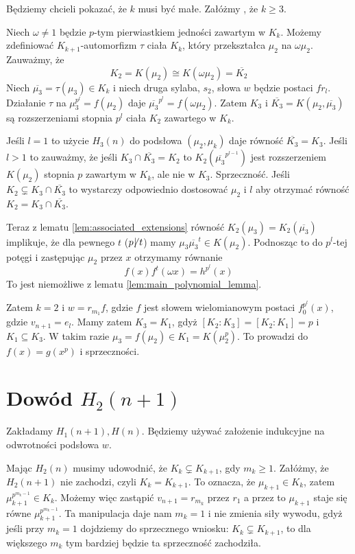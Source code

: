 Będziemy chcieli pokazać, że $k$ musi być małe. Załóżmy , że $k \geq 3$.

Niech $\omega \neq 1$ będzie $p$-tym pierwiastkiem jedności zawartym w $K_k$.
Możemy zdefiniować $K_{k+1}$-automorfizm $\tau$ ciała $K_k$, który przekształca
$\mu_2$ na $\omega \mu_2$.
Zauważmy, że 
\[K_2 = K\left(\mu_2\right) \cong K\left(\omega \mu_2\right) =
\overline{K_2}\]
Niech $\overline{\mu_3} = \tau(\mu_3) \in K_k$ i niech druga sylaba, $s_2$,
słowa $w$ będzie postaci $fr_l$.
Działanie $\tau$ na $\mu_3^{p^l} = f\left(\mu_2\right)$ daje
$\overline{\mu_3}^{p^l} = f\left(\omega\mu_2\right)$. Zatem $K_3$ i
$\overline{K_3} = K\left(\mu_2, \overline{\mu_3}\right)$ są rozszerzeniami
stopnia $p^l$ ciała $K_2$ zawartego w $K_k$.

Jeśli $l = 1$ to użycie $H_3(n)$ do podsłowa $\left(\mu_2, \mu_k\right)$ daje
równość $\overline{K_3} = K_3$. Jeśli $l > 1$ to zauważmy, że jeśli $K_3 \cap
\overline{K_3} = K_2$ to $K_2\left(\overline{\mu_3}^{p^{l-1}}\right)$ jest
rozszerzeniem $K\left(\mu_2\right)$ stopnia $p$ zawartym w $K_k$, ale
nie w $K_3$. Sprzeczność. Jeśli $K_2 \subsetneq K_3 \cap \overline{K_3}$ to
wystarczy odpowiednio dostosować $\mu_2$ i $l$ aby otrzymać równość
$K_2 = K_3 \cap \overline{K_3}$.

Teraz z lematu \ref{lem:associated_extensions} równość $K_2\left(\mu_3\right) =
K_2\left(\overline{\mu_3}\right)$ implikuje, że dla pewnego $t$ 
($p \!\! \not \! | \; t$)
mamy $\mu_3\overline{\mu_3}^t \in K\left(\mu_2\right)$. Podnosząc to do
$p^l$-tej potęgi i zastępując $\mu_2$ przez $x$ otrzymamy równanie
\[ f(x)f^t(\omega x) = h^{p^l}(x)\]
To jest niemożliwe z lematu \ref{lem:main_polynomial_lemma}. 

Zatem $k = 2$ i $w = r_{m_1}f$, gdzie $f$ jest słowem wielomianowym postaci
$f_0^{p^l}(x)$, gdzie $v_{n+1} = e_l$. Mamy zatem $K_3 = K_1$, gdyż 
$\left[K_2 : K_3\right] = \left[K_2 : K_1\right] = p$ i $K_1 \subseteq K_3$.
W takim razie $\mu_3 = f\left(\mu_2\right) \in K_1 = K\left(\mu_2^p\right)$. To
prowadzi do $f(x) = g\left(x^p\right)$ i sprzeczności.

\section{Dowód $H_2(n+1)$}
Zakładamy $H_1(n+1), H(n)$. Będziemy używać założenie indukcyjne na odwrotności
podsłowa $w$.

Mając $H_2(n)$ musimy udowodnić, że $K_k \subsetneq K_{k+1}$, gdy $m_k \geq 1$.
Załóżmy, że $H_2(n+1)$ nie zachodzi, czyli $K_k = K_{k+1}$. To oznacza, że
$\mu_{k+1} \in K_k$, zatem $\mu_{k+1}^{p^{m_k -1}} \in K_k$.
Możemy więc zastąpić $v_{n + 1} = r_{m_k}$ przez $r_1$ a przez to 
$\mu_{k+1}$ staje się równe $\mu_{k+1}^{p^{m_k - 1}}$. Ta manipulacja daje nam
$m_k = 1$ i nie zmienia siły wywodu, gdyż jeśli przy $m_k = 1$ dojdziemy do
sprzecznego wniosku: $K_k \subsetneq K_{k+1}$, to dla większego $m_k$ tym
bardziej będzie ta sprzeczność zachodziła.

